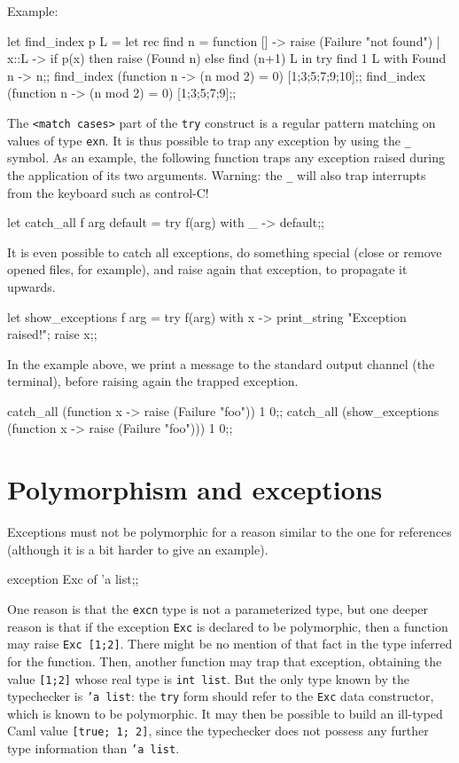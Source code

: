 Example:
\begin{caml_example}
let find_index p L =
  let rec find n =
    function [] -> raise (Failure "not found")
           | x::L -> if p(x) then raise (Found n)
                     else find (n+1) L
  in
    try find 1 L with Found n -> n;;
find_index (function n -> (n mod 2) = 0) [1;3;5;7;9;10];;
find_index (function n -> (n mod 2) = 0) [1;3;5;7;9];;
\end{caml_example}
The \verb"<match cases>" part of the {\tt try} construct is a regular pattern matching on values of type \verb"exn".
It is thus possible to trap any exception
by using the \verb"_" symbol.
As an example, the following function traps any
exception raised during the application of its two arguments. Warning: the
\verb"_" will also trap interrupts from the keyboard such as control-C!
\begin{caml_example}
let catch_all f arg default =
       try f(arg) with _ -> default;;
\end{caml_example}
It is even possible to catch all exceptions, do something special (close or remove opened files, for example), and raise again that exception, to propagate it upwards.
\begin{caml_example}
let show_exceptions f arg =
        try f(arg) with x -> print_string "Exception raised!\n"; raise x;;
\end{caml_example}
In the example above, we print a message to the
standard output channel (the terminal), before raising again the trapped
exception.
\begin{caml_example}
catch_all (function x -> raise (Failure "foo")) 1 0;;
catch_all (show_exceptions (function x -> raise (Failure "foo"))) 1 0;;
\end{caml_example}

\section{Polymorphism and exceptions}

Exceptions must not be polymorphic for a reason similar to the one for
references (although it is a bit harder to give an example).
\begin{caml_example}
exception Exc of 'a list;;
\end{caml_example}
One reason is that the {\tt excn} type is not a parameterized type,
but one deeper reason is that if the exception {\tt Exc} is declared
to be polymorphic, then a function may raise {\tt Exc [1;2]}. There
might be no mention of that fact in the type inferred for the
function.  Then, another function may trap that exception, obtaining
the value {\tt [1;2]} whose real type is {\tt int list}.  But the only
type known by the typechecker is {\tt 'a list}: the {\tt try} form
should refer to the {\tt Exc} data constructor, which is known to be
polymorphic.  It may then be possible to build an ill-typed Caml value
{\tt [true; 1; 2]}, since the typechecker does not possess any further
type information than {\tt 'a list}.

